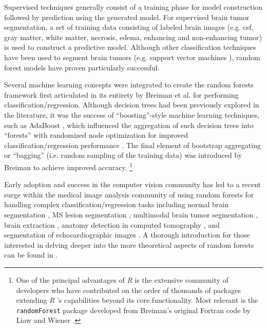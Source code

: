 \documentclass[final,5p,times,twocolumn]{elsarticle}
\begin{document}
Supervised techniques generally consist of a training phase
for model construction followed by prediction using the 
generated model.  For supervised brain tumor segmentation, 
a set of training data consisting of labeled brain images 
(e.g. csf, gray matter, white matter, 
necrosis, edema, enhancing and  non-enhancing tumor) is
used to construct a predictive model.  Although other 
classification techniques have been used to segment
brain tumors (e.g. support vector machines \citep{bauer2011}),
random forest models have proven particularly successful.

Several machine learning concepts were integrated to create 
the random forests framework first articulated in its entirety by Breiman
et al. \cite{breiman2001} for performing classification/regression.  
Although decision trees had been previously explored in the literature, 
it was the success of ``boosting''-style machine learning 
techniques, such as AdaBoost \cite{schapire1990,freund1997}, which influenced 
the aggregation of such decision trees into ``forests'' 
with randomized node optimization for improved
classification/regression performance \cite{ho1995,amit1997}.
The final element of bootstrap aggregating or ``bagging'' (i.e.
random sampling of the training data) was
introduced by Breiman \cite{breiman1996} to achieve improved
accuracy.%
\footnote{
One of the principal advantages of \textit{R} is the extensive community of
developers  who have contributed on the order of thousands of packages 
extending \textit{R} 's capabilities beyond its core functionality.
Most relevant 
is the {\tt randomForest} package developed from Breiman's original
Fortran code by Liaw and Wiener \citep{liaw2002}.
}

Early adoption \cite{viola2005} and success in the
computer vision community
has led to a recent surge within the medical image analysis
community of using random forests for handling complex 
classification/regression tasks including
normal brain segmentation \cite{yi2009},
MS lesion segmentation \cite{geremia2011}, 
multimodal brain tumor segmentation
\cite{bauer2012,zikic2012}, brain extraction \cite{iglesias2010}, 
anatomy detection in computed tomography \cite{criminisi2013}, and
segmentation of echocardiographic images \cite{verhoek2011}. 
A thorough introduction for those interested in delving deeper 
into the more theoretical aspects of random forests can be found
in \cite{criminisi2011}.

\end{document}
